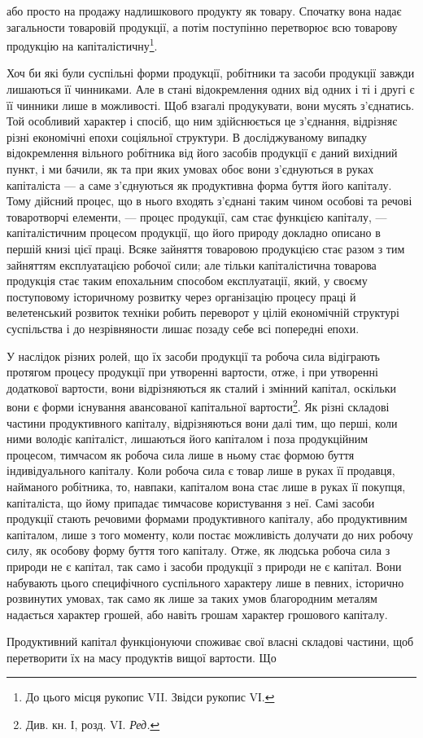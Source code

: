 \parcont{}  %
або просто на продажу надлишкового продукту як товару. Спочатку
вона надає загальности товаровій продукції, а потім поступінно перетворює
всю товарову продукцію на капіталістичну\footnote{
До цього місця рукопис VII. Звідси рукопис VІ.
}.

Хоч би які були суспільні форми продукції, робітники та засоби продукції
завжди лишаються її чинниками. Але в стані відокремлення одних
від одних і ті і другі є її чинники лише в можливості. Щоб взагалі
продукувати, вони мусять з’єднатись. Той особливий характер і спосіб,
що ним здійснюється це з’єднання, відрізняє різні економічні епохи соціяльної
структури. В досліджуваному випадку відокремлення вільного
робітника від його засобів продукції є даний вихідний пункт, і ми
бачили, як та при яких умовах обоє вони з’єднуються в руках капіталіста —
а саме з’єднуються як продуктивна форма буття його капіталу. Тому
дійсний процес, що в нього входять з’єднані таким чином особові та
речові товаротворчі елементи, — процес продукції, сам стає функцією капіталу,
— капіталістичним процесом продукції, що його природу докладно
описано в першій книзі цієї праці. Всяке зайняття товаровою продукцією
стає разом з тим зайняттям експлуатацією робочої сили; але тільки капіталістична
товарова продукція стає таким епохальним способом експлуатації,
який, у своєму поступовому історичному розвитку через організацію
процесу праці й велетенський розвиток техніки робить переворот
у цілій економічній структурі суспільства і до незрівняности лишає позаду
себе всі попередні епохи.

У наслідок різних ролей, що їх засоби продукції та робоча сила відіграють
протягом процесу продукції при утворенні вартости, отже, і
при утворенні додаткової вартости, вони відрізняються як сталий і
змінний капітал, оскільки вони є форми існування авансованої капітальної
вартости\footnote*{
Див. кн. І, розд. VI. \emph{Ред.}
}. Як різні складові частини продуктивного капіталу, відрізняються
вони далі тим, що перші, коли ними володіє капіталіст, лишаються
його капіталом і поза продукційним процесом, тимчасом як робоча сила
лише в ньому стає формою буття індивідуального капіталу. Коли робоча
сила є товар лише в руках її продавця, найманого робітника, то, навпаки,
капіталом вона стає лише в руках її покупця, капіталіста, що
йому припадає тимчасове користування з неї. Самі засоби продукції
стають речовими формами продуктивного капіталу, або продуктивним
капіталом, лише з того моменту, коли постає можливість долучати до
них робочу силу, як особову форму буття того капіталу. Отже,
як людська робоча сила з природи не є капітал, так само і засоби
продукції з природи не є капітал. Вони набувають цього специфічного
суспільного характеру лише в певних, історично розвинутих умовах,
так само як лише за таких умов благородним металям надається характер
грошей, або навіть грошам характер грошового капіталу.

Продуктивний капітал функціонуючи споживає свої власні складові
частини, щоб перетворити їх на масу продуктів вищої вартости. Що
\parbreak{}  %

